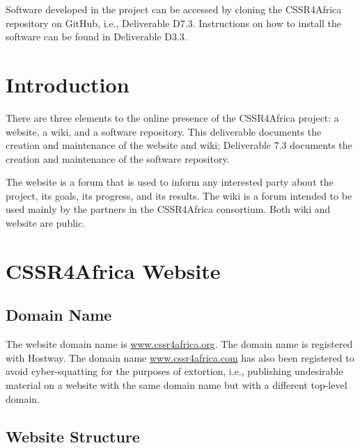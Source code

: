 \documentclass{CSSRforAfrica}
\begin{document}
Software developed in the project can be accessed by cloning the CSSR4Africa repository on GitHub, i.e., Deliverable D7.3. Instructions on how to install the software can be found in Deliverable D3.3.  
\newpage


 
 
\pagebreak
\tableofcontents
\newpage


\section{Introduction}
There are three elements to the online presence of the CSSR4Africa project: a website, a wiki, and a software repository. This deliverable documents the creation and maintenance of the website and wiki; Deliverable 7.3 documents the creation and maintenance of the software repository.

The website is a forum that is used to inform any interested party about the project, its goals, its progress, and its results.  The wiki is a forum intended to be used mainly by the partners in the CSSR4Africa consortium.  Both wiki and website are public.



\section{CSSR4Africa Website}

\subsection{Domain Name}
The website domain name is {\small \url {www.cssr4africa.org}}.  The domain name is registered with Hostway.  The domain name {\small \url {www.cssr4africa.com}} has also been registered to avoid  cyber-squatting for the purposes of extortion, i.e., publishing undesirable material on a website with the same domain name but with a different top-level domain.

\subsection{Website Structure}
\end{document}
